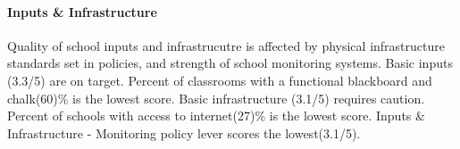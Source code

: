 \documentclass[twocolumn]{article}
\let\oldparagraph\paragraph
\renewcommand{\paragraph}[1]{\oldparagraph{#1}\mbox{}}
\begin{document}
\hypertarget{inputs-infrastructure}{%
\paragraph{\texorpdfstring{\textbf{Inputs \&
Infrastructure}}{Inputs \& Infrastructure}}\label{inputs-infrastructure}}

Quality of school inputs and infrastrucutre is affected by physical
infrastructure standards set in policies, and strength of school
monitoring systems. Basic inputs (3.3/5) are on target. Percent of
classrooms with a functional blackboard and chalk(60)\% is the lowest
score. Basic infrastructure (3.1/5) requires caution. Percent of schools
with access to internet(27)\% is the lowest score. Inputs \&
Infrastructure - Monitoring policy lever scores the lowest(3.1/5).
\end{document}
